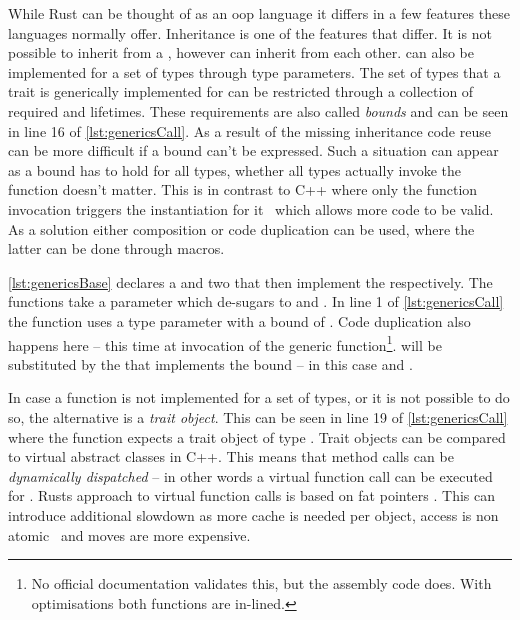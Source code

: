 \documentclass[thesis]{subfiles}
\begin{document}
    While Rust can be thought of as an \gls{oop} language it differs in a few features these languages normally offer.
    Inheritance is one of the features that differ.
    It is not possible to inherit from a \struct, \traits however can inherit from each other.
    \traits can also be implemented for a set of types through type parameters.
    The set of types that a trait is generically implemented for can be restricted through a collection of required \traits and lifetimes.
    These requirements are also called \emph{bounds} and can be seen in line 16 of \autoref{lst:genericsCall}.
    As a result of the missing inheritance code reuse can be more difficult if a bound can't be expressed.
    Such a situation can appear as a bound has to hold for all types, whether all types actually invoke the function doesn't matter.
    This is in contrast to C++ where only the function invocation triggers the instantiation for it~\autocite[§17.8.1 10]{cpp-iso} which allows more code to be valid.
    As a solution either composition or code duplication can be used, where the latter can be done through macros.%
    ~\autocite[10. Generic Types, Traits, and Lifetimes, 17. Object Oriented Programming Features of Rust]{rust-book}

    \autoref{lst:genericsBase} declares a \trait and two \structs that then implement the \trait respectively.
    The functions  take a parameter  which de-sugars to  and .
    In line 1 of \autoref{lst:genericsCall} the function  uses a type parameter \T with a bound of .
    Code duplication also happens here -- this time at invocation of the generic function\footnote{
      No official documentation validates this, but the assembly code does. With optimisations both functions are in-lined.
    }.
    \T will be substituted by the \struct that implements the bound -- in this case  and .

    In case a function is not implemented for a set of types, or it is not possible to do so, the alternative is a \emph{trait object}\autocite[17. Object Oriented Programming Features of Rust]{rust-book}.
    This can be seen in line 19 of \autoref{lst:genericsCall} where the function expects a trait object of type .
    Trait objects can be compared to virtual abstract classes in C++.
    This means that method calls can be \emph{dynamically dispatched} -- in other words a virtual function call can be executed for .
    Rusts approach to virtual function calls is based on fat pointers \autocites[std::raw::TraitObject]{rust-doc}[Trait Objects]{rust-book1}.
    This can introduce additional slowdown as more cache is needed per object, access is non atomic~\autocite[8.2.3.1 ff.]{intel64and} and moves are more expensive.
\end{document}
